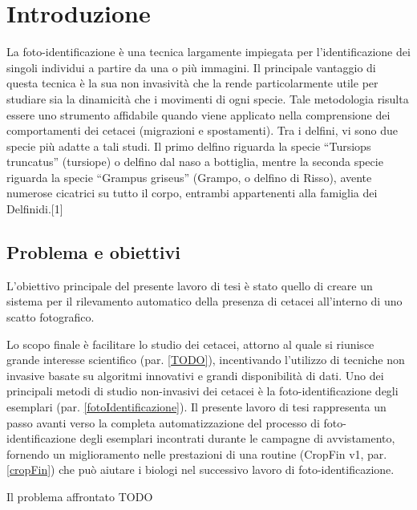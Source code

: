 \chapter{Introduzione}
\label{introduzione}
La foto-identificazione è una tecnica largamente impiegata per l’identificazione dei singoli individui a partire da una o più immagini. Il principale vantaggio di questa tecnica è la sua non invasività che la rende particolarmente utile per studiare sia la dinamicità che i movimenti di ogni specie. Tale metodologia risulta essere uno strumento affidabile quando viene applicato nella comprensione dei comportamenti dei cetacei (migrazioni e spostamenti). Tra i delfini, vi sono due specie più adatte a tali studi.  Il primo delfino riguarda la specie “Tursiops truncatus” (tursiope) o delfino dal naso a bottiglia, mentre la seconda specie riguarda la specie “Grampus griseus” (Grampo, o delfino di Risso), avente numerose cicatrici su tutto il corpo, entrambi appartenenti alla famiglia dei Delfinidi.[1]

\section{Problema e obiettivi}
L'obiettivo principale del presente lavoro di tesi è stato quello di creare un sistema per il rilevamento automatico della presenza di cetacei all'interno di uno scatto fotografico.

Lo scopo finale è facilitare lo studio dei cetacei, attorno al quale si riunisce grande interesse scientifico (par. \ref{TODO}), incentivando l'utilizzo di tecniche non invasive basate su algoritmi innovativi e grandi disponibilità di dati. Uno dei principali metodi di studio non-invasivi dei cetacei è la foto-identificazione degli esemplari (par. \ref{fotoIdentificazione}). Il presente lavoro di tesi rappresenta un passo avanti verso la completa automatizzazione del processo di foto-identificazione degli esemplari incontrati durante le campagne di avvistamento, fornendo un miglioramento nelle prestazioni di una routine (CropFin v1, par. \ref{cropFin}) che può aiutare i biologi nel successivo lavoro di foto-identificazione.

Il problema affrontato TODO